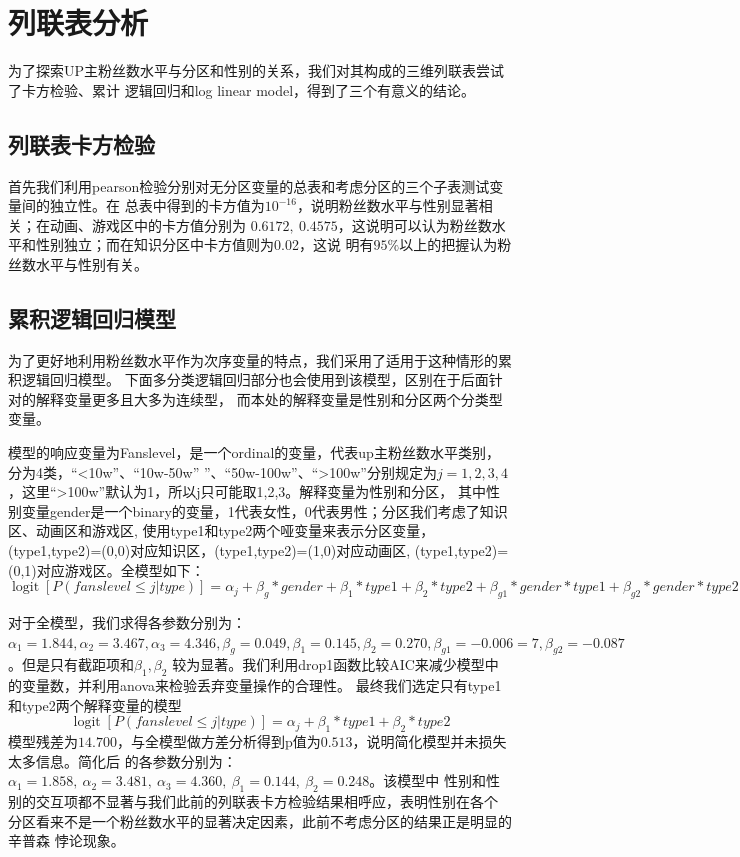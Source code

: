 \documentclass{ctexart}
\begin{document}
\section{列联表分析}

为了探索UP主粉丝数水平与分区和性别的关系，我们对其构成的三维列联表尝试了卡方检验、累计
逻辑回归和log linear model，得到了三个有意义的结论。

\subsection{列联表卡方检验}

首先我们利用pearson检验分别对无分区变量的总表和考虑分区的三个子表测试变量间的独立性。在
总表中得到的卡方值为$10^{-16}$，说明粉丝数水平与性别显著相关；在动画、游戏区中的卡方值分别为
$0.6172,\ 0.4575$，这说明可以认为粉丝数水平和性别独立；而在知识分区中卡方值则为0.02，这说
明有$95\%$以上的把握认为粉丝数水平与性别有关。

\subsection{累积逻辑回归模型}

为了更好地利用粉丝数水平作为次序变量的特点，我们采用了适用于这种情形的累积逻辑回归模型。
下面多分类逻辑回归部分也会使用到该模型，区别在于后面针对的解释变量更多且大多为连续型，
而本处的解释变量是性别和分区两个分类型变量。

模型的响应变量为Fanslevel，是一个ordinal的变量，代表up主粉丝数水平类别，分为4类，“<10w”、“10w-50w”
”、“50w-100w”、“>100w”分别规定为$j=1,2,3,4$，这里“>100w”默认为1，所以j只可能取1,2,3。解释变量为性别和分区，
其中性别变量gender是一个binary的变量，1代表女性，0代表男性；分区我们考虑了知识区、动画区和游戏区,
使用type1和type2两个哑变量来表示分区变量，(type1,type2)=(0,0)对应知识区，(type1,type2)=(1,0)对应动画区,
(type1,type2)=(0,1)对应游戏区。全模型如下：
\begin{equation*}
    \operatorname{logit}[P(fanslevel≤j|type)]=\alpha_j+\beta_g*gender+\beta_1*type1+
    \beta_2*type2+\beta_{g1}*gender*type1+\beta_{g2}*gender*type2
\end{equation*}

对于全模型，我们求得各参数分别为：$\alpha_1=1.844,\alpha_2=3.467,\alpha_3=4.346,\beta_g=0.049,
\beta_1= 0.145, \beta_2=0.270, \beta_{g1}=-0.006=7, \beta_{g2}=-0.087$。但是只有截距项和$\beta_1, \beta_2$
较为显著。我们利用drop1函数比较AIC来减少模型中的变量数，并利用anova来检验丢弃变量操作的合理性。
最终我们选定只有type1和type2两个解释变量的模型
$$\operatorname{logit}[P(fanslevel≤j|type)]=\alpha_j+\beta_1*type1+\beta_2*type2$$
模型残差为$14.700$，与全模型做方差分析得到p值为$0.513$，说明简化模型并未损失太多信息。简化后
的各参数分别为：$\alpha_1=1.858,\ \alpha_2=3.481,\ \alpha_3=4.360,\ \beta_1= 0.144,\ \beta_2=0.248$。该模型中
性别和性别的交互项都不显著与我们此前的列联表卡方检验结果相呼应，表明性别在各个
分区看来不是一个粉丝数水平的显著决定因素，此前不考虑分区的结果正是明显的辛普森
悖论现象。
\end{document}
